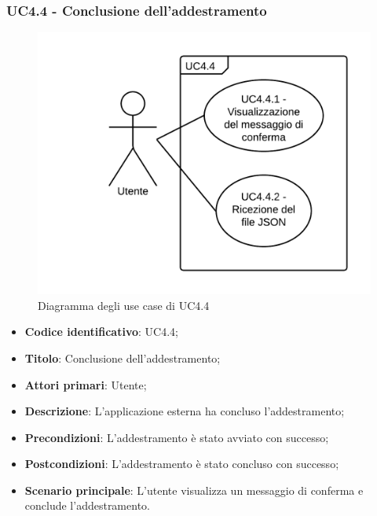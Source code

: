 \subsubsection{UC4.4 - Conclusione dell'addestramento}
\begin{figure}[H]
\includegraphics{img/UC4_4_-_Conclusione_dell_addestramento.png}
\caption{Diagramma degli use case di UC4.4}
\end{figure}
\begin{itemize}
    \item \textbf{Codice identificativo}: UC4.4;
    \item \textbf{Titolo}: Conclusione dell'addestramento;
    \item \textbf{Attori primari}: Utente;
    \item \textbf{Descrizione}: L'applicazione esterna ha concluso l'addestramento;
    \item \textbf{Precondizioni}: L'addestramento è stato avviato con successo;
    \item \textbf{Postcondizioni}: L'addestramento è stato concluso con successo;
    \item \textbf{Scenario principale}: L'utente visualizza un messaggio di conferma e conclude l'addestramento.
\end{itemize}

